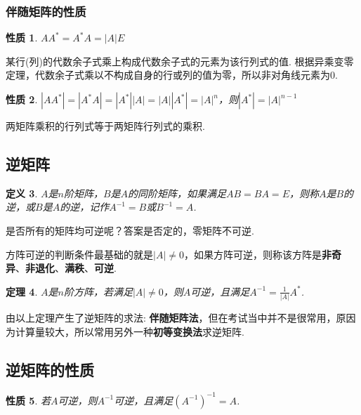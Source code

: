 \documentclass[12pt, a4paper, oneside]{ctexbook}
\newtheorem{theorem}{定理}[section]
\newtheorem{definition}[theorem]{定义}
\newtheorem{quolity}[theorem]{性质}
\begin{document}
\subsubsection{伴随矩阵的性质}

\begin{quolity}
    $AA^* = A^*A = \left | A \right |E$
\end{quolity}

某行(列)的代数余子式乘上构成代数余子式的元素为该行列式的值. 
根据异乘变零定理，代数余子式乘以不构成自身的行或列的值为零，所以非对角线元素为0. 

\begin{quolity}
    $\left | AA^* \right | = \left | A^*A \right | = \left | A^* \right | \left | A \right | = \left | A \right | \left | A^* \right | = \left | A \right |^n$，则$\left | A^* \right | = \left | A \right |^{n-1}$
\end{quolity}

两矩阵乘积的行列式等于两矩阵行列式的乘积. 

\subsection{逆矩阵}

\begin{definition}
    $A$是$n$阶矩阵，$B$是$A$的同阶矩阵，如果满足$AB=BA=E$，则称$A$是$B$的逆，或$B$是$A$的逆，记作$A^{-1} = B$或$B^{-1} = A$. 
\end{definition}

是否所有的矩阵均可逆呢？答案是否定的，零矩阵不可逆. 


方阵可逆的判断条件最基础的就是$\left | A \right | \neq 0$，如果方阵可逆，则称该方阵是\textbf{非奇异}、\textbf{非退化}、\textbf{满秩}、\textbf{可逆}. 

\begin{theorem}
    $A$是$n$阶方阵，若满足$\left | A \right | \neq 0$，则$A$可逆，且满足$A^{-1} = \frac{1}{\left | A \right |}A^*$. 
\end{theorem}

由以上定理产生了逆矩阵的求法: \textbf{伴随矩阵法}，但在考试当中并不是很常用，原因为计算量较大，所以常用另外一种\textbf{初等变换法}求逆矩阵. 

\subsection{逆矩阵的性质}

\begin{quolity}
    若$A$可逆，则$A^{-1}$可逆，且满足$(A^{-1})^{-1} = A$. 
\end{quolity}
\end{document}

